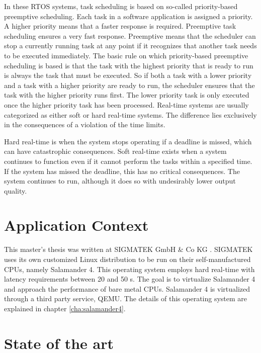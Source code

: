 \documentclass[MMR,Master,english]{twbook}
\begin{document}
\bigskip \noindent In these RTOS systems, task scheduling is based on so-called priority-based preemptive scheduling. Each task in a software application is assigned a priority. A higher priority means that a faster response is required. Preemptive task scheduling ensures a very fast response. Preemptive means that the scheduler can stop a currently running task at any point if it recognizes that another task needs to be executed immediately. The basic rule on which priority-based preemptive scheduling is based is that the task with the highest priority that is ready to run is always the task that must be executed. So if both a task with a lower priority and a task with a higher priority are ready to run, the scheduler ensures that the task with the higher priority runs first. The lower priority task is only executed once the higher priority task has been processed. Real-time systems are usually categorized as either soft or hard real-time systems. The difference lies exclusively in the consequences of a violation of the time limits.

\bigskip \noindent Hard real-time is when the system stops operating if a deadline is missed, which can have catastrophic consequences. Soft real-time exists when a system continues to function even if it cannot perform the tasks within a specified time. If the system has missed the deadline, this has no critical consequences. The system continues to run, although it does so with undesirably lower output quality.

\clearpage
\section{Application Context}
This master's thesis was written at SIGMATEK GmbH \& Co KG \cite{pixelartSIGMATEKKompletteAutomatisierungssysteme}.
SIGMATEK uses its own customized Linux distribution to be run on their self-manufactured CPUs, namely Salamander 4. This operating system employs hard real-time with latency requirements between 20 and 50 \textmu s. The goal is to virtualize Salamander 4 and approach the performance of bare metal CPUs. Salamander 4 is virtualized through a third party service, QEMU. The details of this operating system are explained in chapter \ref{cha:salamander4}.



\clearpage
\section{State of the art}
\clearpage
\end{document}
